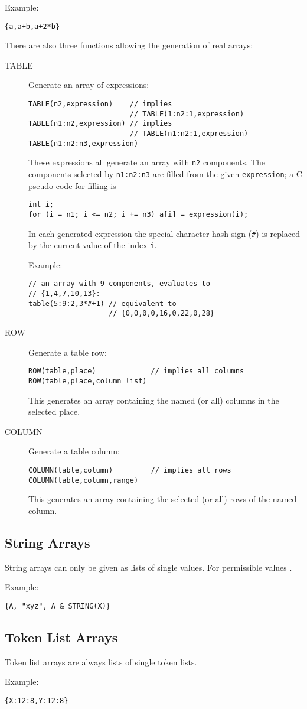 \noindent Example:
\begin{verbatim}
{a,a+b,a+2*b}
\end{verbatim}
There are also three functions allowing the generation of real arrays:
\begin{description}
\item[TABLE]
  Generate an array of expressions:
\begin{verbatim}
TABLE(n2,expression)    // implies 
                        // TABLE(1:n2:1,expression)
TABLE(n1:n2,expression) // implies 
                        // TABLE(n1:n2:1,expression)
TABLE(n1:n2:n3,expression)
\end{verbatim}
  These expressions all generate an array with \texttt{n2} components.
  The components selected by \texttt{n1:n2:n3} are filled from the given
  \texttt{expression};
  a C pseudo-code for filling is
\begin{verbatim}
int i;
for (i = n1; i <= n2; i += n3) a[i] = expression(i);
\end{verbatim}
  In each generated expression the special character hash sign (\texttt{\#})
  is replaced by the current value of the index \texttt{i}.
  \par
  \noindent Example:
\begin{verbatim}
// an array with 9 components, evaluates to 
// {1,4,7,10,13}:
table(5:9:2,3*#+1) // equivalent to 
                   // {0,0,0,0,16,0,22,0,28}
\end{verbatim}
\item[ROW]
  Generate a table row:
\begin{verbatim}
ROW(table,place)             // implies all columns
ROW(table,place,column list)
\end{verbatim}
  This generates an array containing the named (or all) columns in the
  selected place. 
\item[COLUMN]
  Generate a table column:
\begin{verbatim}
COLUMN(table,column)         // implies all rows
COLUMN(table,column,range)
\end{verbatim}
  This generates an array containing the selected (or all) rows of the
  named column.
\end{description}

\subsection{String Arrays}
\label{sec:strarray}
String arrays can only be given as lists of single values.
For permissible values .
\par
\noindent Example:
\begin{verbatim}
{A, "xyz", A & STRING(X)}
\end{verbatim}

\subsection{Token List Arrays}
\label{sec:tokarray}
Token list arrays are always lists of single token lists.
\par
\noindent Example:
\begin{verbatim}
{X:12:8,Y:12:8}
\end{verbatim}

